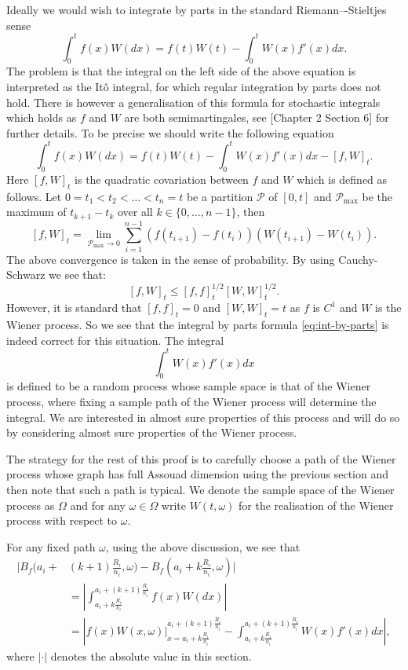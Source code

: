 	Ideally we would wish to integrate by parts in the standard Riemann–-Stieltjes sense
	\begin{equation}
	    \int_{0}^{t}f(x)W(dx)=f(t)W(t)-\int_{0}^{t}W(x)f'(x)dx.\label{eq:int-by-parts}
	\end{equation}
	The problem is that the integral on the left side of the above equation is interpreted as the It\^{o} integral, for which regular integration by parts does not hold. There is however a generalisation of this formula for stochastic integrals which holds as $f$ and $W$ are both semimartingales, see \cite{Pr}[Chapter 2 Section 6] for further details. To be precise we should write the following equation
	\[
	\int_{0}^{t}f(x)W(dx)=f(t)W(t)-\int_{0}^{t}W(x)f'(x)dx-[f,W]_t.
	\]
	Here $[f,W]_t$ is the quadratic covariation between $f$ and $W$ which is defined as follows. Let $0=t_1<t_2<\dots<t_n=t$ be a partition $\mathcal{P}$ of $[0,t]$ and $\mathcal{P}_{\max}$ be the maximum of $t_{k+1}-t_k$ over all $k\in\{0,\dots,n-1\}$, then
	\[
	[f,W]_t=\lim_{\mathcal{P}_{\max}\rightarrow 0} \sum_{i=1}^{n-1} (f(t_{i+1})-f(t_{i}))(W(t_{i+1})-W(t_i)).
	\]
	The above convergence is taken in the sense of probability. By using Cauchy-Schwarz we see that:
	\[
	[f,W]_t\leq [f,f]^{1/2}_t[W,W]^{1/2}_t.
	\]
	However, it is standard that $[f,f]_t=0$ and $[W,W]_t=t$ as $f$ is $C^1$ and $W$ is the Wiener process. So we see that the integral by parts formula \eqref{eq:int-by-parts} is indeed correct for this situation. The integral 
	\[
	\int_0^{t} W(x)f'(x)dx
	\]
	is defined to be a random process whose sample space is that of the Wiener process, where fixing a sample path of the Wiener process will determine the integral. We are interested in almost sure properties of this process and will do so by considering almost sure properties of the Wiener process.
	
	The strategy for the rest of this proof is to carefully choose a path of the Wiener process whose graph has full Assouad dimension using the previous section and then note that such a path is typical. We denote the sample space of the Wiener process as $\Omega$ and for any $\omega \in \Omega$ write $W(t,\omega)$ for the realisation of the Wiener process with respect to $\omega$.
	
	For any fixed path $\omega$, using the above discussion, we see that
	\begin{align*}
		\bigg\vert B_f\bigg(a_i+&(k+1)\frac{R_i}{n_i},\omega\bigg)-B_f\left(a_i+k\frac{R_i}{n_i},\omega\right)\bigg\vert\\
		&= \left| \int_{a_i+k\frac{R_i}{n_i}}^{a_i+(k+1)\frac{R_i}{n_i}} f(x)W(dx)\right|\\
		&= \left| f\left(x\right)W(x,\omega)\bigg\vert_{x=a_i+k\frac{R_i}{n_i}}^{a_i+(k+1)\frac{R_i}{n_i}} - \int_{a_i+k\frac{R_i}{n_i}}^{a_i+(k+1)\frac{R_i}{n_i}} W(x)f'(x)dx \right|,
	\end{align*}
	where $\lvert \cdot \rvert$ denotes the absolute value in this section.
	

